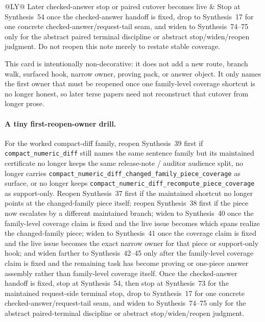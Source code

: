 \documentclass[11pt]{article}
\begin{document}
\begin{table}[t]
\begin{tabularx}{\linewidth}{@{}LY@{}}
Later checked-answer stop or paired cutover becomes live & Stop at Synthesis~54 once the checked-answer handoff is fixed, drop to Synthesis~17 for one concrete checked-answer/request-tail seam, and widen to Synthesis~74--75 only for the abstract paired terminal discipline or abstract stop/widen/reopen judgment. Do not reopen this note merely to restate stable coverage. \\
\bottomrule
\end{tabularx}
\caption{A compact challenge-coverage first-reopen-owner card. This is the smallest owner-cutover map later terse papers can quote directly when a maintained sentence-family coverage shortcut has gone stale and the remaining task is to recover which narrower or wider owner regains authority first.}
\label{tab:challenge-coverage-first-reopen-owner-card}
\end{table}

This card is intentionally non-decorative: it does not add a new route, branch walk, surfaced hook, narrow owner, proving pack, or answer object. It only names the first owner that must be reopened once one family-level coverage shortcut is no longer honest, so later terse papers need not reconstruct that cutover from longer prose.\cite{series:challengeroutes,series:challengestops,series:challengebranches,series:challengesurfacehooks,series:challengeterminalwitnesses,series:challengeanswerreviewmenus,series:publicrequestresponsepacketrefreshresponsepacketclosureverdicts,series:pairedterminalcitationdiscipline,series:pairedterminalcutoverrules}

\paragraph{A tiny first-reopen-owner drill.}
For the worked compact-diff family, reopen Synthesis~39 first if \nolinkurl{compact_numeric_diff} still names the same sentence family but its maintained certificate no longer keeps the same release-note / auditor audience split, no longer carries \nolinkurl{compact_numeric_diff_changed_family_piece_coverage} as \textsf{surface}, or no longer keeps \nolinkurl{compact_numeric_diff_recompute_piece_coverage} as \textsf{support-only}. Reopen Synthesis~37 first if the maintained shortcut no longer points at the changed-family piece itself; reopen Synthesis~38 first if the piece now escalates by a different maintained branch; widen to Synthesis~40 once the family-level coverage claim is fixed and the live issue becomes which spans realize the changed-family piece; widen to Synthesis~41 once the coverage claim is fixed and the live issue becomes the exact narrow owner for that piece or support-only hook; and widen farther to Synthesis~42--45 only after the family-level coverage claim is fixed and the remaining task has become proving or one-piece answer assembly rather than family-level coverage itself. Once the checked-answer handoff is fixed, stop at Synthesis~54, then stop at Synthesis~73 for the maintained request-side terminal stop, drop to Synthesis~17 for one concrete checked-answer/request-tail seam, and widen to Synthesis~74--75 only for the abstract paired-terminal discipline or abstract stop/widen/reopen judgment.\cite{series:workedexample}
\end{document}
